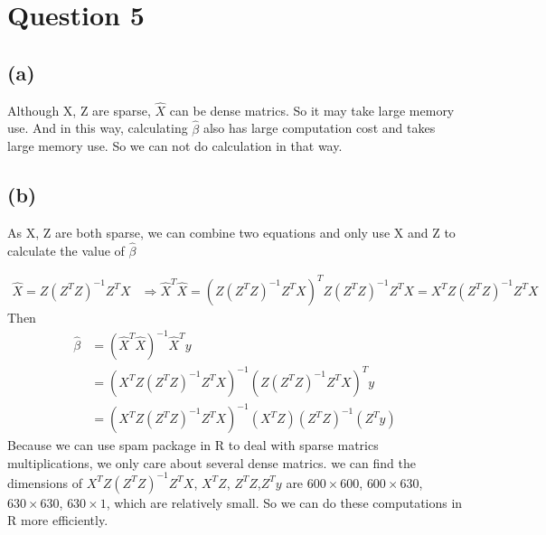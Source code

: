 \documentclass{article}\usepackage[]{graphicx}\usepackage[]{color}
\begin{document}
\section{Question 5}
\subsection{(a)}
Although X, Z are sparse, $\hat{X}$ can be dense matrics. So it may take large memory use. And in this way, calculating $\hat{\beta}$ also has large computation cost and takes large memory use.
So we can not do calculation in that way.

\subsection{(b)}
As X, Z are both sparse, we can combine two equations and only use X and Z to calculate the value of $\hat{\beta}$

\begin{align*}
\hat{X}=Z(Z^TZ)^{-1}Z^TX&\Longrightarrow \hat{X}^T\hat{X}=(Z(Z^TZ)^{-1}Z^TX)^TZ(Z^TZ)^{-1}Z^TX=X^TZ(Z^TZ)^{-1}Z^TX
  \end{align*}
Then 
\begin{align*}
\hat{\beta}&=(\hat{X}^T\hat{X})^{-1}\hat{X}^Ty\\
           &=(X^TZ(Z^TZ)^{-1}Z^TX)^{-1}(Z(Z^TZ)^{-1}Z^TX)^Ty\\
           &=(X^TZ(Z^TZ)^{-1}Z^TX)^{-1}(X^TZ)(Z^TZ)^{-1}(Z^Ty)
  \end{align*}
Because we can use spam package in R to deal with sparse matrics multiplications, we only care about several dense matrics. we can find the dimensions of $X^TZ(Z^TZ)^{-1}Z^TX$, $X^TZ$, $Z^TZ$,$Z^Ty$ are $600\times 600$, $600\times 630$, $630\times 630$, $630\times 1$, which are relatively small. So we can do these computations in R more efficiently.
\end{document}
